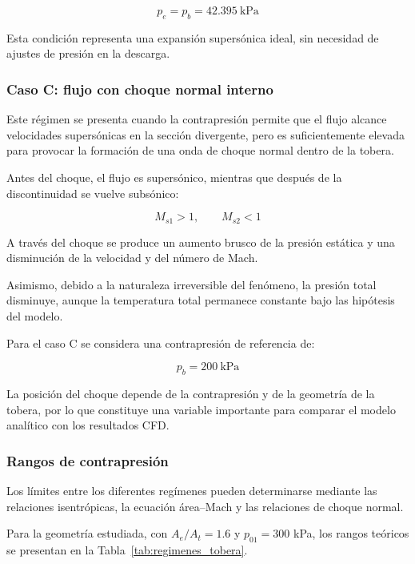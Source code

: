 \documentclass[12pt,letterpaper]{article}
\numberwithin{equation}{section}
\begin{document}
\begin{equation}
    p_e=p_b=42.395\ \mathrm{kPa}
\end{equation}

Esta condición representa una expansión
supersónica ideal, sin necesidad de ajustes
de presión en la descarga.

\subsubsection{Caso C: flujo con choque normal interno}

Este régimen se presenta cuando la contrapresión
permite que el flujo alcance velocidades
supersónicas en la sección divergente, pero
es suficientemente elevada para provocar
la formación de una onda de choque normal
dentro de la tobera.

Antes del choque, el flujo es supersónico,
mientras que después de la discontinuidad
se vuelve subsónico:

\begin{equation}
    M_{s1}>1,
    \qquad
    M_{s2}<1
\end{equation}

A través del choque se produce un aumento
brusco de la presión estática y una
disminución de la velocidad y del número
de Mach.

Asimismo, debido a la naturaleza irreversible
del fenómeno, la presión total disminuye,
aunque la temperatura total permanece
constante bajo las hipótesis del modelo.

Para el caso C se considera una contrapresión
de referencia de:

\begin{equation}
    p_b=200\ \mathrm{kPa}
\end{equation}

La posición del choque depende de la
contrapresión y de la geometría de la tobera,
por lo que constituye una variable importante
para comparar el modelo analítico con
los resultados CFD.

\subsubsection{Rangos de contrapresión}

Los límites entre los diferentes regímenes
pueden determinarse mediante las relaciones
isentrópicas, la ecuación área--Mach y las
relaciones de choque normal.

Para la geometría estudiada, con
$A_e/A_t=1.6$ y $p_{01}=300$ kPa,
los rangos teóricos se presentan en
la Tabla~\ref{tab:regimenes_tobera}.
\end{document}
